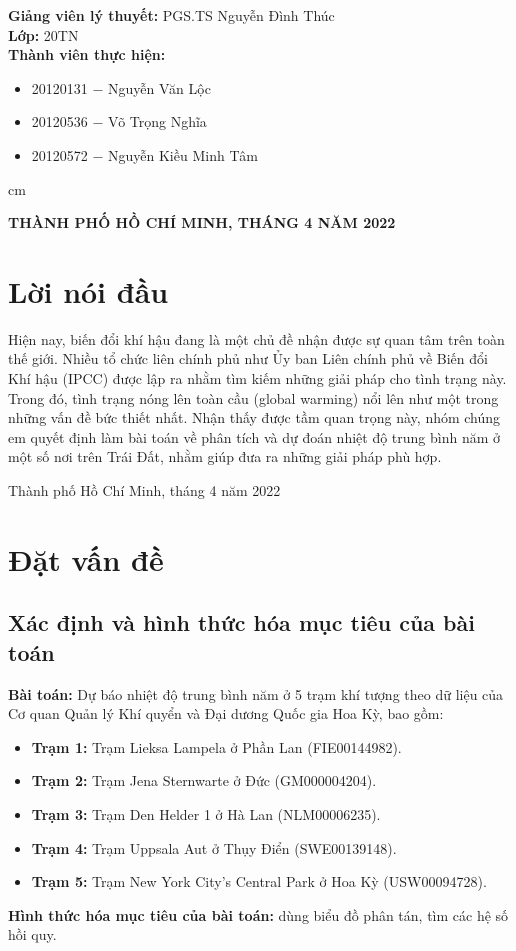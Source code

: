 \documentclass[a4paper]{article}
\begin{document}
\begin{titlepage}
\begin{mybox}
\textbf{Giảng viên lý thuyết:} PGS.TS Nguyễn Đình Thúc\\
\textbf{Lớp:} 20TN\\
\textbf{Thành viên thực hiện:}
\begin{itemize}
\item 20120131 $-$ Nguyễn Văn Lộc
\item 20120536 $-$ Võ Trọng Nghĩa
\item 20120572 $-$ Nguyễn Kiều Minh Tâm
\end{itemize}
 cm
\begin{center}
\textbf{THÀNH PHỐ HỒ CHÍ MINH, THÁNG 4 NĂM 2022}
\end{center}
\end{mybox}
\end{titlepage}

\section*{Lời nói đầu}
Hiện nay, biến đổi khí hậu đang là một chủ đề nhận được sự quan tâm trên toàn thế giới. Nhiều tổ chức liên chính phủ như Ủy ban Liên chính phủ về Biến đổi Khí hậu (IPCC) được lập ra nhằm tìm kiếm những giải pháp cho tình trạng này. Trong đó, tình trạng nóng lên toàn cầu (global warming) nổi lên như một trong những vấn đề bức thiết nhất. Nhận thấy được tầm quan trọng này, nhóm chúng em quyết định làm bài toán về phân tích và dự đoán nhiệt độ trung bình năm ở một số nơi trên Trái Đất, nhằm giúp đưa ra những giải pháp phù hợp.
\begin{flushright}
Thành phố Hồ Chí Minh, tháng 4 năm 2022
\end{flushright} 
\newpage

\tableofcontents
\listoffigures
\listoftables
\newpage



\section{Đặt vấn đề}
\subsection{Xác định và hình thức hóa mục tiêu của bài toán}
\textbf{Bài toán:} Dự báo nhiệt độ trung bình năm ở 5 trạm khí tượng theo dữ liệu của Cơ quan Quản lý Khí quyển và Đại dương Quốc gia Hoa Kỳ, bao gồm:
\begin{itemize}
\item \textbf{Trạm 1:} Trạm Lieksa Lampela ở Phần Lan (FIE00144982).
\item \textbf{Trạm 2:} Trạm Jena Sternwarte ở Đức (GM000004204).
\item \textbf{Trạm 3:} Trạm Den Helder 1 ở Hà Lan (NLM00006235).
\item \textbf{Trạm 4:} Trạm Uppsala Aut ở Thụy Điển (SWE00139148).
\item \textbf{Trạm 5:} Trạm New York City's Central Park ở Hoa Kỳ (USW00094728).
\end{itemize}
\textbf{Hình thức hóa mục tiêu của bài toán:} dùng biểu đồ phân tán, tìm các hệ số hồi quy.
\end{document}
